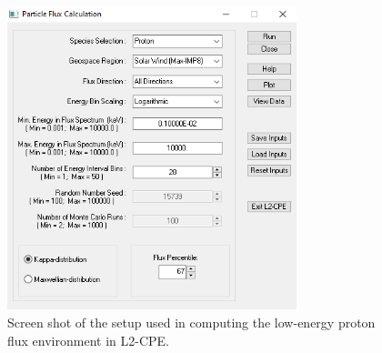 \documentclass{hitec}
\begin{document}
\begin{figure}[htbp!]
	\centering
	\includegraphics[width=0.75\textwidth]{../L2CPE/L2-CPE-Setup.PNG}
	\caption{Screen shot of the setup used in computing the low-energy proton flux environment in L2-CPE.}\label{fig:L2-CPE-Setup}
\end{figure}



\end{document}

